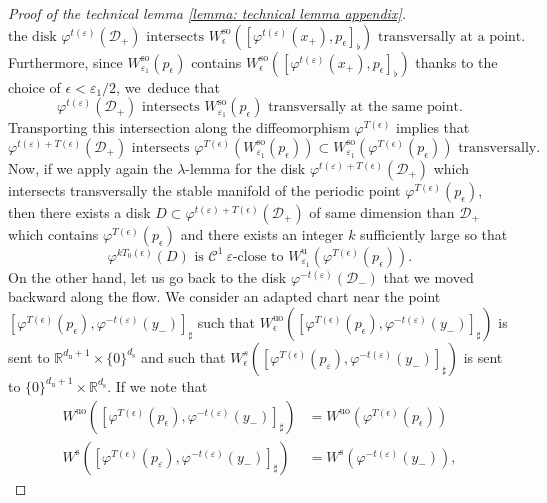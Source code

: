\documentclass[JEP,XML,SOM,Unicode,NoEqCountersInSection,NoFloatCountersInSection,published]{cedram}
\newcommand{\rs}{\mathrm{s}}
\newcommand{\rso}{\mathrm{so}}
\newcommand{\ru}{\mathrm{u}}
\newcommand{\ruo}{\mathrm{uo}}
\theoremstyle{definition}
\theoremstyle{plain}
\newcommand{\Ccal}{\mathcal{C}}
\newcommand{\D}{\mathcal{D}}
\newcommand{\R}{\mathbb{R}}
\begin{document}
\begin{appendix}
\begin{proof}[Proof of the technical lemma \ref{lemma: technical lemma appendix}]
\[
\text{the disk $\varphi^{t (\varepsilon)} (\D_{+})$ intersects $W_{\epsilon}^{\rso} ([\varphi^{t (\varepsilon)} (x_+),p_{\epsilon}]_{\flat})$ transversally at a point.}
\]
Furthermore, since $W_{\varepsilon_1}^{\rso} (p_{\epsilon})$ contains $W_{\epsilon}^{\rso} ([\varphi^{t (\varepsilon)} (x_+),p_{\epsilon}]_{\flat})$ thanks to the choice of $\epsilon < \varepsilon_1 / 2$, we~deduce that
\[
\varphi^{t (\varepsilon)} (\D_{+}) \text{ intersects } W_{\varepsilon_1}^{\rso} (p_{\epsilon}) \text{ transversally at the same point}.
\]
Transporting this intersection along the diffeomorphism $\varphi^{T (\epsilon)}$ implies that
\[
\varphi^{t (\varepsilon)+ T (\epsilon)} (\D_{+}) \text{ intersects } \varphi^{T (\epsilon)} \left(W_{\varepsilon_1}^{\rso} (p_{\epsilon}) \right) \subset W_{\varepsilon_1}^{\rso} (\varphi^{T (\epsilon)} (p_{\epsilon})) \text{ transversally}.
\]
Now, if we apply again the $\lambda$-lemma for the disk $\varphi^{t (\varepsilon)+ T (\epsilon)} (\D_{+})$ which intersects transversally the stable manifold of the periodic point $\varphi^{T (\epsilon)} (p_{\epsilon})$, then there exists a disk $D \subset \varphi^{t (\varepsilon)+ T (\epsilon)} (\D_{+})$ of same dimension than $\D_+$ which contains $\varphi^{T (\epsilon)} (p_{\epsilon})$ and there exists an integer $k$ sufficiently large so that
\begin{equation}\label{eq: proof technical lemma - final transversality pushing forward}
\varphi^{k T_0 (\epsilon)} (D) \text{ is } \Ccal^1 \: \varepsilon \text{-close to } W_{\varepsilon_1}^{\ru} (\varphi^{T (\epsilon)} (p_{\epsilon})).
\end{equation}
On the other hand, let us go back to the disk $\varphi^{-t (\varepsilon)}(\D_{-})$ that we moved backward along the flow. We consider an adapted chart near the point $[\varphi^{T (\epsilon)} (p_{\epsilon}), \varphi^{- t (\varepsilon)} (y_-)]_{\sharp}$ such that $W_{\epsilon}^{\ruo}([\varphi^{T (\epsilon)} (p_{\epsilon}), \varphi^{- t (\varepsilon)} (y_-)]_{\sharp}) $ is sent to $\R^{d_\ru + 1} \times \{0\}^{d_\rs}$ and such that $W_{\epsilon}^{s} ([\varphi^{T (\epsilon)} (p_{\varepsilon}), \varphi^{- t (\varepsilon)} (y_-)]_{\sharp}) $ is sent to $\{0\}^{d_\ru + 1 } \times \R^{d_\rs}$. If we note that
\begin{align*}
W^{\ruo}([\varphi^{T (\epsilon)} (p_{\epsilon}), \varphi^{- t (\varepsilon)} (y_-)]_{\sharp}) &= W^{\ruo}(\varphi^{T (\epsilon)} (p_{\epsilon}))\\
\tag*{and}
W^{\rs} ([\varphi^{T (\epsilon)} (p_{\varepsilon}), \varphi^{- t (\varepsilon)} (y_-)]_{\sharp}) &= W^{\rs} (\varphi^{- t (\varepsilon)} (y_-)),

\end{align*}
\end{proof}
\end{appendix}
\end{document}
